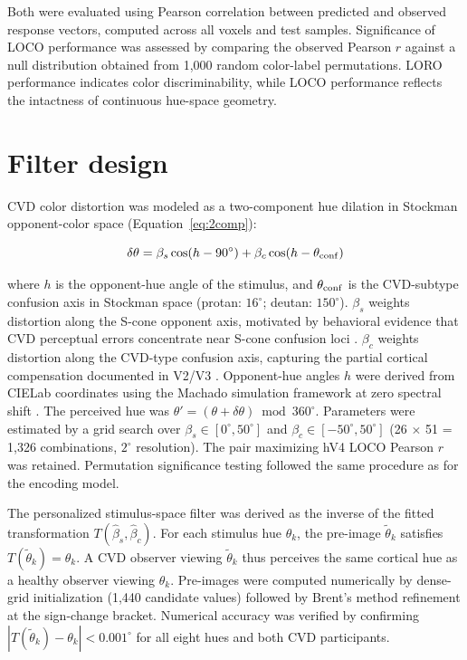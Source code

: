 Both were evaluated using Pearson correlation between predicted and observed response vectors, computed across all voxels and test samples. Significance of LOCO performance was assessed by comparing the observed Pearson $r$ against a null distribution obtained from 1,000 random color-label permutations. LORO performance indicates color discriminability, while LOCO performance reflects the intactness of continuous hue-space geometry.

\section{Filter design}
\label{sec:methods:filter}

CVD color distortion was modeled as a two-component hue dilation in Stockman opponent-color space (Equation~\ref{eq:2comp}):

\begin{equation}
\delta\theta = \beta_s \cos(h - 90^\circ) +
               \beta_c \cos(h - \theta_{\rm conf})
\label{eq:2comp}
\end{equation}

where $h$ is the opponent-hue angle of the stimulus, and $\theta_{\rm conf}$ is the CVD-subtype confusion axis in Stockman space (protan: $16^\circ$; deutan: $150^\circ$). $\beta_s$ weights distortion along the S-cone opponent axis, motivated by behavioral evidence that CVD perceptual errors concentrate near S-cone confusion loci \cite{emery2021}. $\beta_c$ weights distortion along the CVD-type confusion axis, capturing the partial cortical compensation documented in V2/V3 \cite{tregillus2021}. Opponent-hue angles $h$ were derived from CIELab coordinates using the Machado simulation framework at zero spectral shift \cite{machado2009}. The perceived hue was $\theta' = (\theta + \delta\theta) \bmod 360^\circ$. Parameters were estimated by a grid search over $\beta_s \in [0^\circ, 50^\circ]$ and $\beta_c \in [-50^\circ, 50^\circ]$ (26 $\times$ 51 = 1,326 combinations, $2^\circ$ resolution). The pair maximizing hV4 LOCO Pearson $r$ was retained. Permutation significance testing followed the same procedure as for the encoding model.

The personalized stimulus-space filter was derived as the inverse of the fitted transformation $T(\hat{\beta}_s, \hat{\beta}_c)$. For each stimulus hue $\theta_k$, the pre-image $\tilde{\theta}_k$ satisfies $T(\tilde{\theta}_k) = \theta_k$. A CVD observer viewing $\tilde{\theta}_k$ thus perceives the same cortical hue as a healthy observer viewing $\theta_k$. Pre-images were computed numerically by dense-grid initialization (1,440 candidate values) followed by Brent's method refinement at the sign-change bracket. Numerical accuracy was verified by confirming $|T(\tilde{\theta}_k) - \theta_k| < 0.001^\circ$ for all eight hues and both CVD participants.

